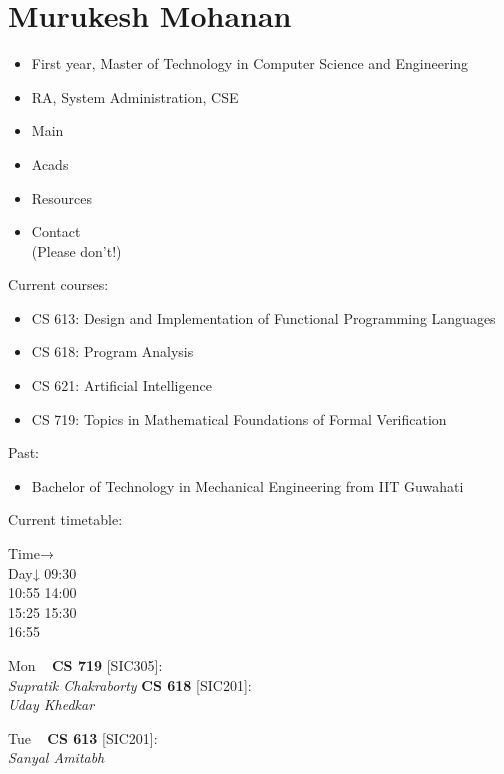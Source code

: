 \documentclass{article}
\begin{document}
		
			\section*{Murukesh Mohanan}
			\begin{itemize}
				\item First year, Master of Technology in Computer Science and Engineering
				\item RA, System Administration, CSE
			\end{itemize}
		 
		 
			\begin{itemize}
				\item Main
				\item Acads
				\item Resources
				\item Contact\\ (Please don't!)
			\end{itemize}
		
		
			Current courses:\begin{itemize}
				\item CS 613: Design and Implementation of Functional Programming Languages
				\item CS 618: Program Analysis
				\item CS 621: Artificial Intelligence
				\item CS 719: Topics in Mathematical Foundations of Formal Verification
			\end{itemize}
			
			Past:\begin{itemize}
				\item Bachelor of Technology in Mechanical Engineering from IIT Guwahati
			\end{itemize}
			
			Current timetable:
			\par 

			
				
					Time→ \\
								Day↓ 
					09:30\\10:55
					14:00\\15:25
					15:30\\16:55
				
				
					Mon
					~
					\textbf{CS 719} [SIC305]: \\\emph{Supratik Chakraborty}
					\textbf{CS 618} [SIC201]: \\\emph{Uday Khedkar}~
				
				
					Tue
					~
					\textbf{CS 613} [SIC201]: \\\emph{Sanyal Amitabh}~
					~
				
\end{document}
